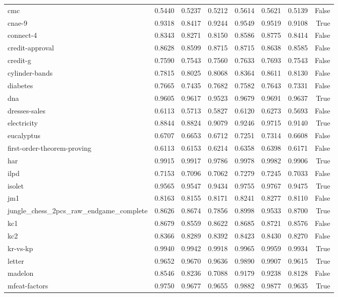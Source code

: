 \begin{table}[htbp]
\begin{tabular}{lrrrrrrr}
cmc & 0.5440 & 0.5237 & 0.5212 & 0.5614 & 0.5621 & 0.5139 & False \\
cnae-9 & 0.9318 & 0.8417 & 0.9244 & 0.9549 & 0.9519 & 0.9108 & True \\
connect-4 & 0.8343 & 0.8271 & 0.8150 & 0.8586 & 0.8775 & 0.8414 & False \\
credit-approval & 0.8628 & 0.8599 & 0.8715 & 0.8715 & 0.8638 & 0.8585 & False \\
credit-g & 0.7590 & 0.7543 & 0.7560 & 0.7633 & 0.7693 & 0.7543 & False \\
cylinder-bands & 0.7815 & 0.8025 & 0.8068 & 0.8364 & 0.8611 & 0.8130 & False \\
diabetes & 0.7665 & 0.7435 & 0.7682 & 0.7582 & 0.7643 & 0.7331 & False \\
dna & 0.9605 & 0.9617 & 0.9523 & 0.9679 & 0.9691 & 0.9637 & True \\
dresses-sales & 0.6113 & 0.5713 & 0.5827 & 0.6120 & 0.6273 & 0.5693 & False \\
electricity & 0.8844 & 0.8824 & 0.9079 & 0.9246 & 0.9715 & 0.9140 & True \\
eucalyptus & 0.6707 & 0.6653 & 0.6712 & 0.7251 & 0.7314 & 0.6608 & False \\
first-order-theorem-proving & 0.6113 & 0.6153 & 0.6214 & 0.6358 & 0.6398 & 0.6171 & False \\
har & 0.9915 & 0.9917 & 0.9786 & 0.9978 & 0.9982 & 0.9906 & True \\
ilpd & 0.7153 & 0.7096 & 0.7062 & 0.7279 & 0.7245 & 0.7033 & False \\
isolet & 0.9565 & 0.9547 & 0.9434 & 0.9755 & 0.9767 & 0.9475 & True \\
jm1 & 0.8163 & 0.8155 & 0.8171 & 0.8241 & 0.8277 & 0.8110 & False \\
jungle\_chess\_2pcs\_raw\_endgame\_complete & 0.8626 & 0.8674 & 0.7856 & 0.8998 & 0.9533 & 0.8700 & True \\
kc1 & 0.8679 & 0.8559 & 0.8622 & 0.8685 & 0.8721 & 0.8576 & False \\
kc2 & 0.8366 & 0.8289 & 0.8392 & 0.8423 & 0.8430 & 0.8270 & False \\
kr-vs-kp & 0.9940 & 0.9942 & 0.9918 & 0.9965 & 0.9959 & 0.9934 & True \\
letter & 0.9652 & 0.9670 & 0.9636 & 0.9890 & 0.9907 & 0.9615 & True \\
madelon & 0.8546 & 0.8236 & 0.7088 & 0.9179 & 0.9238 & 0.8128 & False \\
mfeat-factors & 0.9750 & 0.9677 & 0.9655 & 0.9882 & 0.9877 & 0.9635 & True \\

\end{tabular}
\end{table}
